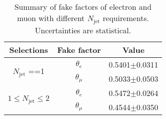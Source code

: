 \begin{table}[!ht]
\begin{center}
\begin{tabular}{c|c|c}
\hline
\hline
Selections  &Fake factor   &Value  \\
\hline
\multirow{2}{*}{$N_\text{jet}$ ==1} &$\theta_{e}$   &0.5401$\pm$0.0311    \\
\cline{2-3}
                                    &$\theta_{\mu}$ &0.5033$\pm$0.0503    \\
\hline
\multirow{2}{*}{$1\leq N_{\text{jet}} \leq 2$}  &$\theta_{e}$   &0.5472$\pm$0.0264    \\
\cline{2-3}
                                                &$\theta_{\mu}$ &0.4544$\pm$0.0350    \\
\hline
\hline
\end{tabular}
\caption{Summary of fake factors of electron and muon with different $N_{\text{jet}}$ requirements. Uncertainties are statistical.}
\label{tab:summary_fake_factor}
\end{center}
\end{table}
